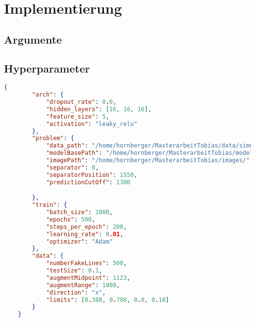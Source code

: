 \chapter{Implementierung}

\section{Argumente}



\section{Hyperparameter}

\begin{lstlisting}[language=json,firstnumber=1, caption={Beispiel eines Hyperparameter Files in JSON}, captionpos=b, label=lst-hyperparam]
    {
        "arch": {
            "dropout_rate": 0.0,
            "hidden_layers": [16, 16, 16],
            "feature_size": 5,
            "activation": "leaky_relu"
        },
        "problem": {
            "data_path": "/home/hornberger/MasterarbeitTobias/data/simulated/SpheresDownsampled",
            "modelBasePath": "/home/hornberger/MasterarbeitTobias/models/simulated/",
            "imagePath": "/home/hornberger/MasterarbeitTobias/images/",
            "separator": 0,
            "separatorPosition": 1550,
            "predictionCutOff": 1300

        },
        "train": {
            "batch_size": 1000,
            "epochs": 500,
            "steps_per_epoch": 200,
            "learning_rate": 0.01,
            "optimizer": "Adam"
        },
        "data": {
            "numberFakeLines": 500,
            "testSize": 0.1,
            "augmentMidpoint": 1123,
            "augmentRange": 1000,
            "direction": "x",
            "limits": [0.388, 0.788, 0.0, 0.18]
        }
    }

    
\end{lstlisting}
    



